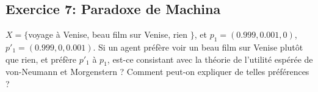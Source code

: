 \subsection{Exercice 7: Paradoxe de Machina}
$X = \{ $voyage à Venise, beau film sur Venise, rien $\}$, et $p_1
= (0.999,0.001,0)$, $p'_1 = (0.999,0,0.001)$. Si un agent préfère
voir un beau film sur Venise plut\^ot que rien, et préfère $p'_1$
à $p_1$, est-ce consistant avec la théorie de l'utilité espérée de
von-Neumann et Morgenstern ? Comment peut-on expliquer de telles
préférences ?
